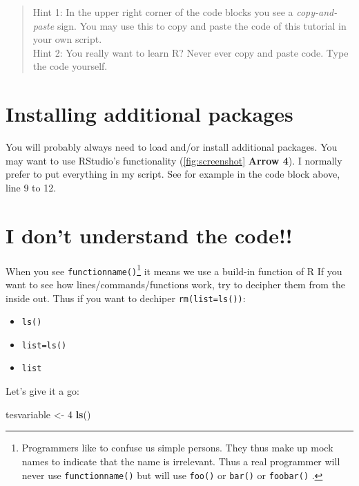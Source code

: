 \documentclass[
]{book}
\newenvironment{Shaded}{\begin{snugshade}}{\end{snugshade}}
\newcommand{\DecValTok}[1]{\textcolor[rgb]{0.00,0.00,0.81}{#1}}
\newcommand{\KeywordTok}[1]{\textcolor[rgb]{0.13,0.29,0.53}{\textbf{#1}}}
\newcommand{\NormalTok}[1]{#1}
\newcommand{\StringTok}[1]{\textcolor[rgb]{0.31,0.60,0.02}{#1}}
\providecommand{\tightlist}{%
  \setlength{\itemsep}{0pt}\setlength{\parskip}{0pt}}
\begin{document}
\begin{quote}
Hint 1: In the upper right corner of the code blocks you see a \emph{copy-and-paste} sign. You may use this to copy and paste the code of this tutorial in your own script.\\
Hint 2: You really want to learn R? Never ever copy and paste code. Type the code yourself.
\end{quote}

\hypertarget{installing-additional-packages}{%
\section{Installing additional packages}\label{installing-additional-packages}}

You will probably always need to load and/or install additional packages. You may want to use RStudio's functionality (\ref{fig:screenshot} \textbf{Arrow 4}). I normally prefer to put everything in my script. See for example in the code block above, line 9 to 12.

\hypertarget{i-dont-understand-the-code}{%
\section{I don't understand the code!!}\label{i-dont-understand-the-code}}

When you see \texttt{functionname()}\footnote{Programmers like to confuse us simple persons. They thus make up mock names to indicate that the name is irrelevant. Thus a real programmer will never use \texttt{functionname()} but will use \texttt{foo()} or \texttt{bar()} or \texttt{foobar()} .} it means we use a build-in function of R If you want to see how lines/commands/functions work, try to decipher them from the inside out. Thus if you want to dechiper \texttt{rm(list=ls())}:

\begin{itemize}
\tightlist
\item
  \texttt{ls()}
\item
  \texttt{list=ls()}
\item
  \texttt{list}
\end{itemize}

Let's give it a go:

\begin{Shaded}
\begin{Highlighting}[numbers=left,,]
\NormalTok{tesvariable <-}\StringTok{ }\DecValTok{4}
\KeywordTok{ls}\NormalTok{()}
\end{Highlighting}
\end{Shaded}
\end{document}
